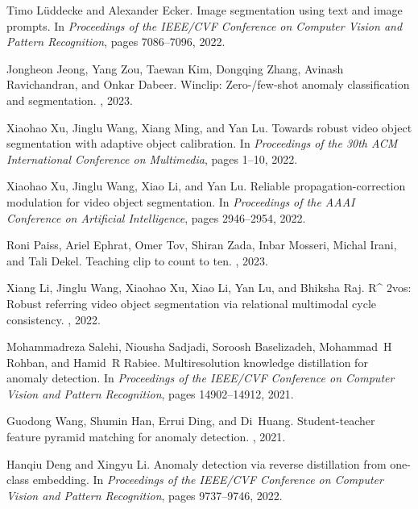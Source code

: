 {\begin{thebibliography}{10}
Timo L{\"u}ddecke and Alexander Ecker.
\newblock Image segmentation using text and image prompts.
\newblock In {\em Proceedings of the IEEE/CVF Conference on Computer Vision and
  Pattern Recognition}, pages 7086--7096, 2022.

Jongheon Jeong, Yang Zou, Taewan Kim, Dongqing Zhang, Avinash Ravichandran, and
  Onkar Dabeer.
\newblock Winclip: Zero-/few-shot anomaly classification and segmentation.
, 2023.

Xiaohao Xu, Jinglu Wang, Xiang Ming, and Yan Lu.
\newblock Towards robust video object segmentation with adaptive object
  calibration.
\newblock In {\em Proceedings of the 30th ACM International Conference on
  Multimedia}, pages 1--10, 2022.

Xiaohao Xu, Jinglu Wang, Xiao Li, and Yan Lu.
\newblock Reliable propagation-correction modulation for video object
  segmentation.
\newblock In {\em Proceedings of the AAAI Conference on Artificial
  Intelligence}, pages 2946--2954, 2022.

Roni Paiss, Ariel Ephrat, Omer Tov, Shiran Zada, Inbar Mosseri, Michal Irani,
  and Tali Dekel.
\newblock Teaching clip to count to ten.
, 2023.

Xiang Li, Jinglu Wang, Xiaohao Xu, Xiao Li, Yan Lu, and Bhiksha Raj.
\newblock R\^{} 2vos: Robust referring video object segmentation via relational
  multimodal cycle consistency.
, 2022.

Mohammadreza Salehi, Niousha Sadjadi, Soroosh Baselizadeh, Mohammad~H Rohban,
  and Hamid~R Rabiee.
\newblock Multiresolution knowledge distillation for anomaly detection.
\newblock In {\em Proceedings of the IEEE/CVF Conference on Computer Vision and
  Pattern Recognition}, pages 14902--14912, 2021.

Guodong Wang, Shumin Han, Errui Ding, and Di~Huang.
\newblock Student-teacher feature pyramid matching for anomaly detection.
, 2021.

Hanqiu Deng and Xingyu Li.
\newblock Anomaly detection via reverse distillation from one-class embedding.
\newblock In {\em Proceedings of the IEEE/CVF Conference on Computer Vision and
  Pattern Recognition}, pages 9737--9746, 2022.


\end{thebibliography}}
